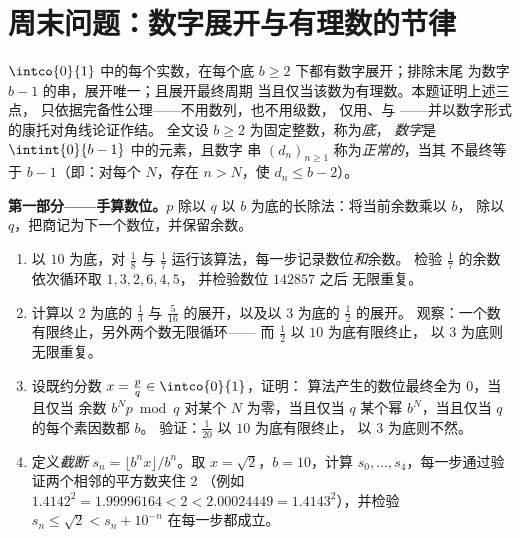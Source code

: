 \section{周末问题：数字展开与有理数的节律}

\begin{problem}
\label{pb:b1:reals:1}
$\intco{0}{1}$ 中的每个实数，在每个底
$b \geq 2$ 下都有数字展开；排除末尾
为数字 $b - 1$ 的串，展开唯一；且展开最终周期
当且仅当该数为有理数。本题证明上述三点，
只依据完备性公理——不用数列，也不用级数，
仅用、与
——并以数字形式的康托对角线论证作结。
全文设 $b \geq 2$ 为固定整数，称为\emph{底}，
\emph{数字}是 $\intint{0}{b-1}$ 中的元素，且数字
串 $(d_n)_{n \geq 1}$ 称为\emph{正常的}，当其
不最终等于 $b - 1$（即：对每个 $N$，存在 $n >
N$，使 $d_n \leq b - 2$）。

\medskip
\noindent\textbf{第一部分——手算数位。}$p$ 除以
$q$ 以 $b$ 为底的长除法：将当前余数乘以 $b$，
除以 $q$，把商记为下一个数位，并保留余数。
\begin{enumerate}
  \item 以 $10$ 为底，对 $\frac 18$ 与
        $\frac 17$ 运行该算法，每一步记录数位\emph{和}余数。
        检验 $\frac 17$ 的余数依次循环取 $1, 3, 2, 6, 4, 5$，
        并检验数位 $142857$ 之后
        无限重复。
  \item 计算以 $2$ 为底的 $\frac 13$ 与
        $\frac{5}{16}$ 的展开，以及以 $3$ 为底的 $\frac 12$ 的展开。
        观察：一个数有限终止，另外两个数无限循环——
        而 $\frac 12$ 以 $10$ 为底有限终止，
        以 $3$ 为底则无限重复。
  \item 设既约分数 $x = \frac pq \in \intco{0}{1}$，证明：
        算法产生的数位最终全为 $0$，当且仅当
        余数 $b^N p \bmod q$ 对某个 $N$ 为零，当且仅当
        $q$ 某个幂 $b^N$，当且仅当
        $q$ 的每个素因数都 $b$。
        验证：$\frac{1}{20}$ 以 $10$ 为底有限终止，
        以 $3$ 为底则不然。
  \item 定义\emph{截断} $s_n = \lfloor b^n x \rfloor
        / b^n$。取 $x = \sqrt 2$，$b = 10$，计算 $s_0,
        \dots, s_4$，每一步通过验证两个相邻的平方数夹住 $2$
        （例如 $1.4142^2
        = 1.99996164 < 2 < 2.00024449 = 1.4143^2$），并检验
        $s_n \leq \sqrt 2 < s_n + 10^{-n}$ 在每一步都成立。
\end{enumerate}


\end{problem}
